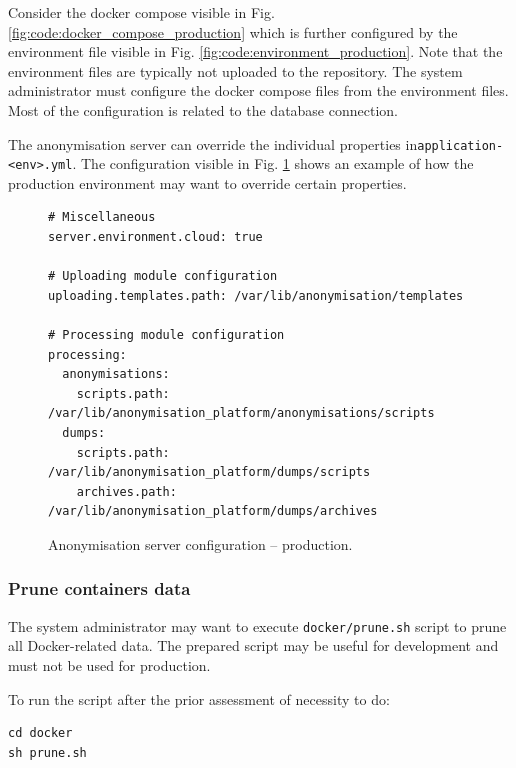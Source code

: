 \documentclass[a4paper,twoside,12pt]{book}
\begin{document}
Consider the docker compose visible in Fig. \ref{fig:code:docker_compose_production} which is further configured by the environment file visible in Fig. \ref{fig:code:environment_production}.
Note that the environment files are typically not uploaded to the repository. The system administrator must configure the docker compose files from the environment files. Most of the configuration is related to the database connection.



The anonymisation server can override the individual properties in\newline \verb|application-<env>.yml|. The configuration visible in Fig. \ref{fig:code:application_prod_yml} shows an example of how the production environment may want to override certain properties.

\begin{figure}[H]
\begin{verbatim}
# Miscellaneous
server.environment.cloud: true

# Uploading module configuration
uploading.templates.path: /var/lib/anonymisation/templates

# Processing module configuration
processing:
  anonymisations:
    scripts.path: /var/lib/anonymisation_platform/anonymisations/scripts
  dumps:
    scripts.path: /var/lib/anonymisation_platform/dumps/scripts
    archives.path: /var/lib/anonymisation_platform/dumps/archives
\end{verbatim}
\caption{Anonymisation server configuration -- production.}
\label{fig:code:application_prod_yml}
\end{figure}

\subsubsection{Prune containers data}

The system administrator may want to execute \verb|docker/prune.sh| script to prune all Docker-related data. The prepared script may be useful for development and must not be used for production.

To run the script after the prior assessment of necessity to do:
\begin{verbatim}
cd docker
sh prune.sh
\end{verbatim}
\end{document}
